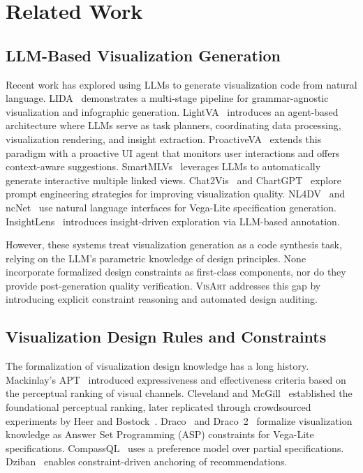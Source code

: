 \documentclass[final,5p,times,twocolumn]{elsarticle}
\newcommand{\sysname}{\textsc{VisArt}}
\begin{document}
\section{Related Work}

\subsection{LLM-Based Visualization Generation}

Recent work has explored using LLMs to generate visualization code from natural language.
LIDA~\cite{dibia2023lida} demonstrates a multi-stage pipeline for grammar-agnostic visualization and infographic generation.
LightVA~\cite{li2024lightva} introduces an agent-based architecture where LLMs serve as task planners, coordinating data processing, visualization rendering, and insight extraction.
ProactiveVA~\cite{zhao2025proactiveva} extends this paradigm with a proactive UI agent that monitors user interactions and offers context-aware suggestions.
SmartMLVs~\cite{shu2025smartmlvs} leverages LLMs to automatically generate interactive multiple linked views.
Chat2Vis~\cite{maddigan2023chat2vis} and ChartGPT~\cite{tian2024chartgpt} explore prompt engineering strategies for improving visualization quality.
NL4DV~\cite{narechania2020nl4dv} and ncNet~\cite{luo2022ncnet} use natural language interfaces for Vega-Lite specification generation.
InsightLens~\cite{lu2024insightlens} introduces insight-driven exploration via LLM-based annotation.

However, these systems treat visualization generation as a code synthesis task, relying on the LLM's parametric knowledge of design principles.
None incorporate formalized design constraints as first-class components, nor do they provide post-generation quality verification.
\sysname{} addresses this gap by introducing explicit constraint reasoning and automated design auditing.

\subsection{Visualization Design Rules and Constraints}

The formalization of visualization design knowledge has a long history.
Mackinlay's APT~\cite{mackinlay1986automating} introduced expressiveness and effectiveness criteria based on the perceptual ranking of visual channels.
Cleveland and McGill~\cite{cleveland1984graphical} established the foundational perceptual ranking, later replicated through crowdsourced experiments by Heer and Bostock~\cite{heer2010crowdsourcing}.
Draco~\cite{moritz2018formalizing} and Draco~2~\cite{zeng2023draco2} formalize visualization knowledge as Answer Set Programming (ASP) constraints for Vega-Lite specifications.
CompassQL~\cite{wongsuphasawat2016towards} uses a preference model over partial specifications.
Dziban~\cite{lin2020dziban} enables constraint-driven anchoring of recommendations.
\end{document}

